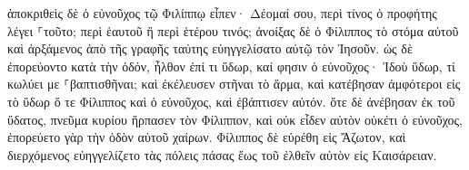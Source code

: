 \documentclass{openreader}
\begin{document}
ἀποκριθεὶς δὲ ὁ εὐνοῦχος τῷ Φιλίππῳ εἶπεν· Δέομαί σου, περὶ τίνος ὁ προφήτης λέγει ⸀τοῦτο; περὶ ἑαυτοῦ ἢ περὶ ἑτέρου τινός; 
ἀνοίξας δὲ ὁ Φίλιππος τὸ στόμα αὐτοῦ καὶ ἀρξάμενος ἀπὸ τῆς γραφῆς ταύτης εὐηγγελίσατο αὐτῷ τὸν Ἰησοῦν. 
ὡς δὲ ἐπορεύοντο κατὰ τὴν ὁδόν, ἦλθον ἐπί τι ὕδωρ, καί φησιν ὁ εὐνοῦχος· Ἰδοὺ ὕδωρ, τί κωλύει με ⸀βαπτισθῆναι; 
καὶ ἐκέλευσεν στῆναι τὸ ἅρμα, καὶ κατέβησαν ἀμφότεροι εἰς τὸ ὕδωρ ὅ τε Φίλιππος καὶ ὁ εὐνοῦχος, καὶ ἐβάπτισεν αὐτόν. 
ὅτε δὲ ἀνέβησαν ἐκ τοῦ ὕδατος, πνεῦμα κυρίου ἥρπασεν τὸν Φίλιππον, καὶ οὐκ εἶδεν αὐτὸν οὐκέτι ὁ εὐνοῦχος, ἐπορεύετο γὰρ τὴν ὁδὸν αὐτοῦ χαίρων. 
Φίλιππος δὲ εὑρέθη εἰς Ἄζωτον, καὶ διερχόμενος εὐηγγελίζετο τὰς πόλεις πάσας ἕως τοῦ ἐλθεῖν αὐτὸν εἰς Καισάρειαν. 
\end{document}
